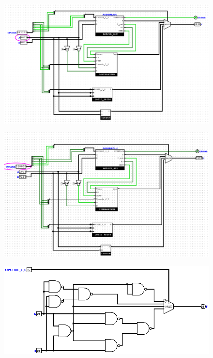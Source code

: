\documentclass[a4paper]{article}
\begin{document}
\begin{figure}[H]
    \centering
    \includegraphics[width=\textwidth]{src/ALU_TEST_COMP_111.png}
    \label{fig:TEST_ALU_COMP_111}
\end{figure}


\begin{figure}[H]
    \centering
    \includegraphics[width=\textwidth]{src/ALU_TEST_CUSTOM.png}
    \label{fig:TEST_ALU_CUSTO}
\end{figure}


\begin{figure}[H]
    \centering
    \includegraphics[width=\textwidth]{src/LOGIC_1BIT.png}
    \label{fig:LOGIQUE_1BIT}
\end{figure}
\end{document}
